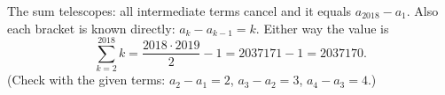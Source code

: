 The sum telescopes: all intermediate terms cancel and it equals $a_{2018}-a_1$. Also each bracket is known directly: $a_k-a_{k-1}=k$. Either way the value is
\[
\sum_{k=2}^{2018}k=\dfrac{2018\cdot2019}{2}-1=2037171-1=\boxed{2037170}.
\]
(Check with the given terms: $a_2-a_1=2$, $a_3-a_2=3$, $a_4-a_3=4$.)
